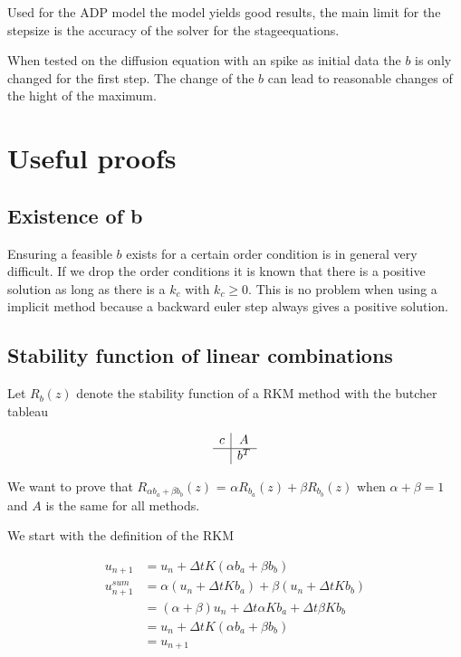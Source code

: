 \documentclass{article}
\begin{document}
Used for the ADP model the model yields good results, the main limit for the stepsize is the accuracy of the solver for the stageequations.

When tested on the diffusion equation with an spike as initial data the $b$ is only changed for the first step. The change of the $b$ can lead to reasonable changes of the hight of the maximum. 



\section{Useful proofs}

\subsection{Existence of b}
Ensuring a feasible $b$ exists for a certain order condition is in general very difficult.
If we drop the order conditions it is known that there is a positive solution as long as there is a $k_c$ with $k_c \geq 0$.
This is no problem when using a implicit method because a backward euler step always gives a positive solution. 

\subsection{Stability function of linear combinations}\label{proof:combiningb}
Let $R_b(z)$ denote the stability function of a RKM method with the butcher tableau

$$
\begin{array}
{c|c}
c & A\\
\hline
& b^T
\end{array}
$$

We want to prove that $R_{\alpha b_a+\beta b_b}(z)$ = $\alpha R_{ b_a}(z)+\beta R_{b_b}(z)$ when $\alpha + \beta = 1$ and $A$ is the same for all methods.

We start with the definition of the RKM

\begin{align}
u_{n+1} &= u_n + \Delta t K (\alpha b_a+\beta b_b) \label{eq:u_n+1}  \\
u_{n+1}^{sum} &= \alpha (u_n + \Delta t K b_a) + \beta (u_n + \Delta t K b_b) \label{eq:u_n+1_sum} \\
& = (\alpha + \beta) u_n + \Delta t \alpha K b_a + \Delta t \beta K b_b \\
&= u_n + \Delta t K (\alpha b_a+\beta b_b) \\
&=u_{n+1} 
\end{align}
\end{document}
